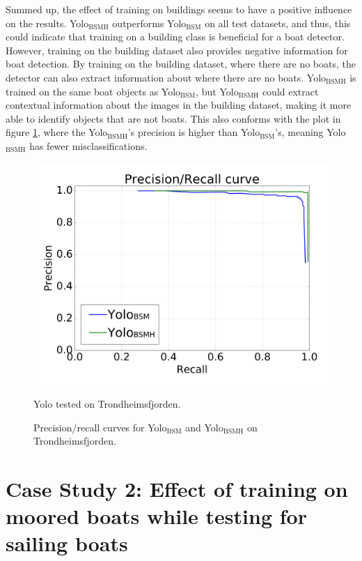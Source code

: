 \vspace{2mm}
\noindent
Summed up, the effect of training on buildings seems to have a positive influence on the results. Yolo$_{\text{BSMH}}$ outperforms Yolo$_{\text{BSM}}$ on all test datasets, and thus, this could indicate that training on a building class is beneficial for a boat detector. However, training on the building dataset also provides negative information for boat detection. By training on the building dataset, where there are no boats, the detector can also extract information about where there are no boats. Yolo$_{\text{BSMH}}$ is trained on the same boat objects as Yolo$_{\text{BSM}}$, but Yolo$_{\text{BSMH}}$ could extract contextual information about the images in the building dataset, making it more able to identify objects that are not boats. This also conforms with the plot in figure \ref{fig:yolo_trf_prec}, where the Yolo$_{\text{BSMH}}$'s precision is higher than Yolo$_{\text{BSM}}$'s, meaning Yolo$_{\text{BSMH}}$ has fewer misclassifications.

\begin{figure}[h!]
  \centering
  \includegraphics[width=0.8\linewidth]{results/case_buildings/prec_recall/yolo/trf-eps.png}
  \caption{Yolo tested on Trondheimsfjorden.}
  \label{fig:ex_trf_prec_rec_yolo}
\caption{Precision/recall curves for Yolo$_{\text{BSM}}$ and Yolo$_{\text{BSMH}}$ on Trondheimsfjorden.}
\label{fig:yolo_trf_prec}
\end{figure}

\newpage
\clearpage

\section{Case Study 2: Effect of training on moored boats while testing for sailing boats}
\label{sec:moored_boats}

